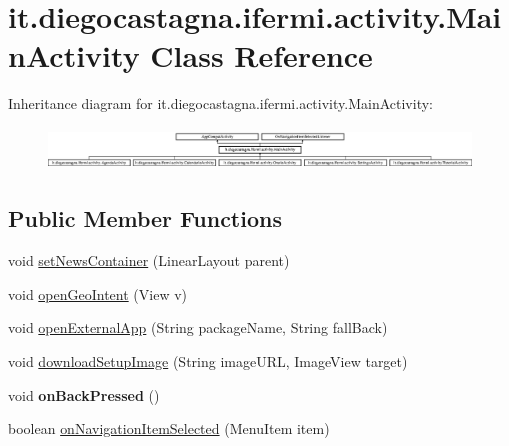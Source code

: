 \hypertarget{classit_1_1diegocastagna_1_1ifermi_1_1activity_1_1_main_activity}{}\section{it.\+diegocastagna.\+ifermi.\+activity.\+Main\+Activity Class Reference}
\label{classit_1_1diegocastagna_1_1ifermi_1_1activity_1_1_main_activity}
Inheritance diagram for it.\+diegocastagna.\+ifermi.\+activity.\+Main\+Activity\+:\begin{figure}[H]
\begin{center}
\leavevmode
\includegraphics[height=1.123746cm]{classit_1_1diegocastagna_1_1ifermi_1_1activity_1_1_main_activity}
\end{center}
\end{figure}
\subsection*{Public Member Functions}
\begin{DoxyCompactItemize}
\item 
void \mbox{\hyperlink{classit_1_1diegocastagna_1_1ifermi_1_1activity_1_1_main_activity_a2a5889506d04ccd70a021e29238af5a2}{set\+News\+Container}} (Linear\+Layout parent)
\item 
void \mbox{\hyperlink{classit_1_1diegocastagna_1_1ifermi_1_1activity_1_1_main_activity_a42f99843a6cf096f02d0a2559c4b18e1}{open\+Geo\+Intent}} (View v)
\item 
void \mbox{\hyperlink{classit_1_1diegocastagna_1_1ifermi_1_1activity_1_1_main_activity_a13ab282bb4ca77a5e9532b512fd8d96a}{open\+External\+App}} (String package\+Name, String fall\+Back)
\item 
void \mbox{\hyperlink{classit_1_1diegocastagna_1_1ifermi_1_1activity_1_1_main_activity_a2f9037b4c85fd4af6f70c9a9a785f879}{download\+Setup\+Image}} (String image\+U\+RL, Image\+View target)
\item 
\mbox{\label{classit_1_1diegocastagna_1_1ifermi_1_1activity_1_1_main_activity_a85b1a91181657fb951ff1267c252f816}} 
void {\bfseries on\+Back\+Pressed} ()
\item 
boolean \mbox{\hyperlink{classit_1_1diegocastagna_1_1ifermi_1_1activity_1_1_main_activity_a04c855d571d357939e6b2ee18436d0bc}{on\+Navigation\+Item\+Selected}} (Menu\+Item item)
\end{DoxyCompactItemize}
